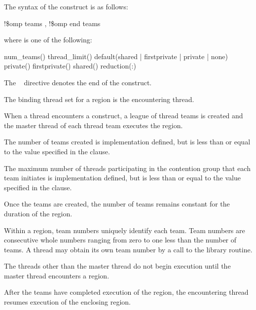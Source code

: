 \fortranspecificstart
The syntax of the  construct is as follows:

\begin{boxedcode}
!\$omp teams \plc{[clause[ [},\plc{] clause] ... ]}
!\$omp end teams
\end{boxedcode}

where  is one of the following:

\begin{indentedcodelist}
num\_teams()
thread\_limit()
default(shared \textnormal{|} firstprivate \textnormal{|} private \textnormal{|} none)
private()
firstprivate()
shared()
reduction(:)
\end{indentedcodelist}

The ~ directive denotes the end of the  construct.
\fortranspecificend

\binding
The binding thread set for a  region is the encountering thread.

\descr
When a thread encounters a  construct, a league of thread teams is created and 
the master thread of each thread team executes the  region.

The number of teams created is implementation defined, but is less than or equal to the 
value specified in the  clause.

The maximum number of threads participating in the contention group that each team 
initiates is implementation defined, but is less than or equal to the value specified in the 
 clause.

Once the teams are created, the number of teams remains constant for the duration of the 
 region.

Within a  region, team numbers uniquely identify each team. Team numbers are 
consecutive whole numbers ranging from zero to one less than the number of teams. A 
thread may obtain its own team number by a call to the  library 
routine.

The threads other than the master thread do not begin execution until the master thread 
encounters a  region.

After the teams have completed execution of the  region, the encountering thread 
resumes execution of the enclosing  region.

